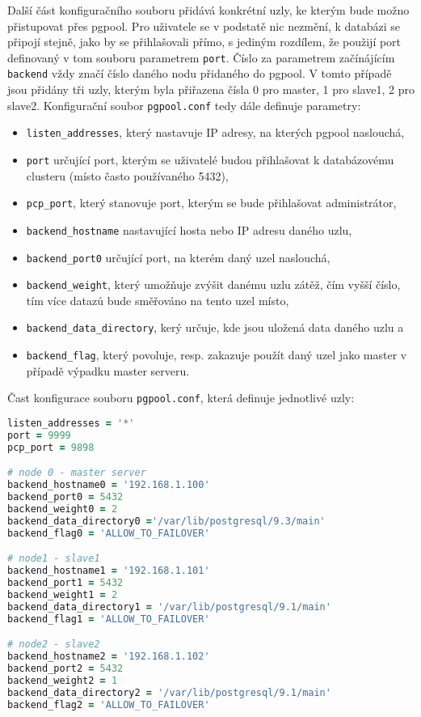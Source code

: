 Další část konfiguračního souboru přidává konkrétní uzly, ke kterým bude možno přistupovat přes pgpool. Pro uživatele se v podstatě nic nezmění, k databázi se připojí stejně, jako by se přihlašovali přímo, s jediným rozdílem, že použijí port definovaný v tom souboru parametrem \texttt{port}. Číslo za parametrem začínájícím \texttt{backend} vždy značí číslo daného nodu přidaného do pgpool. V tomto případě jsou přidány tři uzly, kterým byla přiřazena čísla 0 pro master, 1 pro slave1, 2 pro slave2. Konfigurační soubor \texttt{pgpool.conf} tedy dále definuje parametry: 
\begin{itemize}
\item \texttt{listen\_addresses}, který nastavuje IP adresy, na kterých pgpool naslouchá, 
\item \texttt{port} určující port, kterým se uživatelé budou přihlašovat k databázovému clusteru (místo často používaného 5432), 
\item \texttt{pcp\_port}, který stanovuje port, kterým se bude přihlašovat administrátor, 
\item \texttt{backend\_hostname} nastavující hosta nebo IP adresu daného uzlu, 
\item \texttt{backend\_port0} určující port, na kterém daný uzel naslouchá, 
\item \texttt{backend\_weight}, který umožňuje zvýšit danému uzlu zátěž, čím vyšší číslo, tím více datazů bude směřováno na tento uzel místo, 
\item \texttt{backend\_data\_directory}, kerý určuje, kde jsou uložená data daného uzlu a 
\item \texttt{backend\_flag}, který povoluje, resp. zakazuje použít daný uzel jako master v případě výpadku master serveru.
\end{itemize}

Čast konfigurace souboru \texttt{pgpool.conf}, která definuje jednotlivé uzly:
\begin{lstlisting}[language=ruby]
listen_addresses = '*'
port = 9999 		
pcp_port = 9898 	

# node 0 - master server
backend_hostname0 = '192.168.1.100' 			
backend_port0 = 5432 					
backend_weight0 = 2					
backend_data_directory0 ='/var/lib/postgresql/9.3/main'
backend_flag0 = 'ALLOW_TO_FAILOVER'	      

# node1 - slave1
backend_hostname1 = '192.168.1.101'
backend_port1 = 5432
backend_weight1 = 2
backend_data_directory1 = '/var/lib/postgresql/9.1/main'
backend_flag1 = 'ALLOW_TO_FAILOVER'

# node2 - slave2
backend_hostname2 = '192.168.1.102'
backend_port2 = 5432
backend_weight2 = 1
backend_data_directory2 = '/var/lib/postgresql/9.1/main'
backend_flag2 = 'ALLOW_TO_FAILOVER'
\end{lstlisting}

